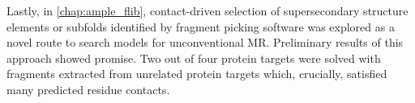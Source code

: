 Lastly, in \cref{chap:ample_flib}, contact-driven selection of supersecondary structure elements or subfolds identified by fragment picking software was explored as a novel route to search models for unconventional MR. Preliminary results of this approach showed promise. Two out of four protein targets were solved with fragments extracted from unrelated protein targets which, crucially, satisfied many predicted residue contacts.

\onehalfspacing

